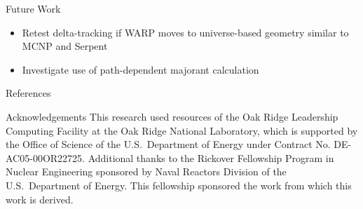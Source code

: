 \documentclass[final]{beamer}
\begin{document}
\begin{frame}{}
\begin{columns}[t]
\begin{column}{.3\linewidth}
\begin{block}{\large Future Work}
\begin{itemize}
				\item{Retest delta-tracking if WARP moves to universe-based geometry similar to MCNP and Serpent}
          			\item Investigate use of path-dependent majorant calculation
          		\end{itemize}
        	\end{block}
			\vfill
        	\begin{block}{\large References}
			\printbibliography
        	\end{block}
			\vfill
        	\begin{block}{\large Acknowledgements}
		\justifying
This research used resources of the Oak Ridge Leadership Computing Facility at the Oak Ridge National Laboratory, which is supported by the Office of Science of the U.S.\ Department of Energy under Contract No. DE-AC05-00OR22725. Additional thanks to the Rickover Fellowship Program in Nuclear Engineering sponsored by Naval Reactors Division of the U.S.\ Department of Energy. This fellowship sponsored the work from which this work is derived. 
        	\end{block}
      \end{column}
    \end{columns}
  \end{frame}
\end{document}

